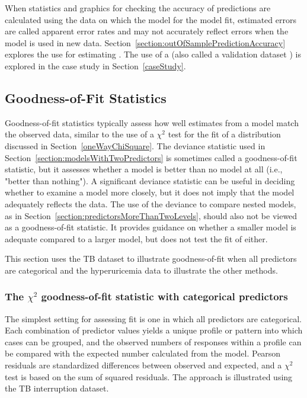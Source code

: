 When statistics and graphics for checking the accuracy of predictions are calculated using the data on which the model for the model fit, estimated errors are called apparent error rates  and may not accurately reflect errors when the model is used in new data.  Section~\ref{section:outOfSamplePredictionAccuracy} explores the use  for estimating .  The use of a  (also called a validation dataset ) is explored in the case study in Section~\ref{caseStudy}.

\subsection{Goodness-of-Fit Statistics}
\label{section:goodnesOfFitLogistic}

Goodness-of-fit statistics typically assess how well estimates from a model match the observed data, similar to the use of a $\chi^2$ test for the fit of a distribution discussed in Section~\ref{oneWayChiSquare}. The deviance statistic used in Section~\ref{section:modelsWithTwoPredictors} is sometimes called a goodness-of-fit statistic, but it assesses whether a model is better than no model at all (i.e., "better than nothing"). A significant deviance statistic can be useful in deciding whether to examine a model more closely, but it does not imply that the model adequately reflects the data.  The use of the deviance to compare nested models, as in  Section~\ref{section:predictorsMoreThanTwoLevels}, should also not be viewed as a goodness-of-fit statistic.  It provides guidance on whether a smaller model is adequate compared to a larger model, but does not test the fit of either.

This section uses the TB dataset to illustrate goodness-of-fit when all predictors are categorical and the hyperuricemia data to illustrate the other methods.

\subsubsection{The $\chi^2$ goodness-of-fit statistic with categorical predictors}


The simplest setting for assessing fit is one in which all predictors are categorical.  Each combination of predictor values yields a unique profile or pattern into which cases can be grouped, and the observed numbers of responses within a profile can be compared with the expected number calculated from the model.  Pearson residuals are standardized differences between observed and expected, and a $\chi^2$ test is based on the sum of squared residuals.  The approach is illustrated using the TB interruption dataset.

